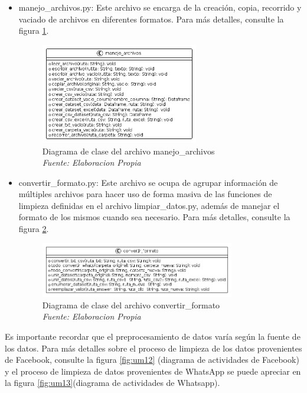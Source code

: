 \begin{itemize}

\item manejo\_archivos.py: Este archivo se encarga de la creación, copia, recorrido y vaciado de archivos en diferentes formatos. Para más detalles, consulte la figura \ref{fig:uml3}.

\begin{figure}[h!]
	\includegraphics[width=0.65\textwidth]{capitulo5/figuras/fig3.png}
	\caption[Diagrama de clase del archivo manejo\_archivos]{Diagrama de clase del archivo manejo\_archivos
		\\\textit{Fuente: Elaboracion Propia}}
	\label{fig:uml3}
\end{figure}


\item convertir\_formato.py: Este archivo se ocupa de agrupar información de múltiples archivos para hacer uso de forma masiva de las funciones de limpieza definidas en el archivo limpiar\_datos.py, además de manejar el formato de los mismos cuando sea necesario. Para más detalles, consulte la figura \ref{fig:uml4}.

\begin{figure}[h!]
	\includegraphics[width=0.8\textwidth]{capitulo5/figuras/fig4.png}
	\caption[Diagrama de clase del archivo convertir\_formato]{Diagrama de clase del archivo convertir\_formato
		\\\textit{Fuente: Elaboracion Propia}}
	\label{fig:uml4}
\end{figure}

\end{itemize}

Es importante recordar que el preprocesamiento de datos varía según la fuente de los datos. Para más detalles sobre el proceso de limpieza de los datos provenientes de Facebook, consulte la figura \ref{fig:um12} (diagrama de actividades de Facebook) y el proceso de limpieza de datos provenientes de WhatsApp se puede apreciar en la figura \ref{fig:um13}(diagrama de actividades de Whatsapp).

